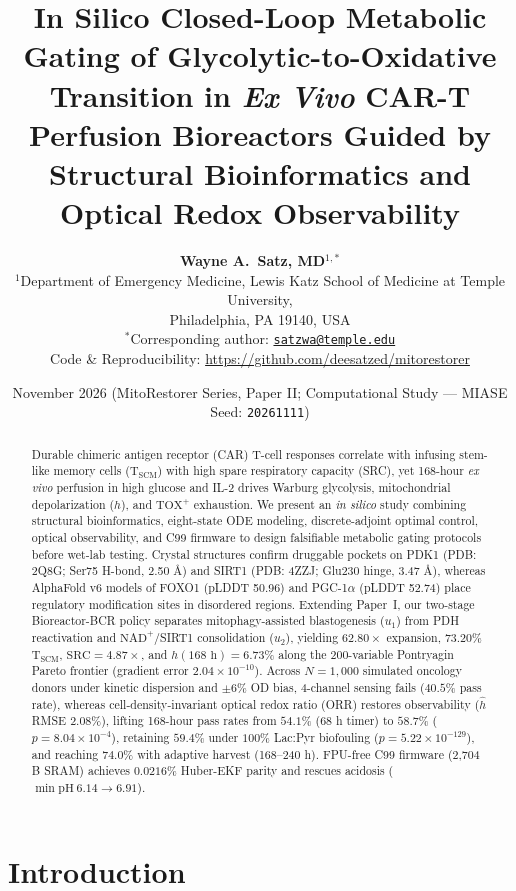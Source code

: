 \documentclass[11pt]{article}
\title{\LARGE\bfseries In Silico Closed-Loop Metabolic Gating of Glycolytic-to-Oxidative Transition in \textit{Ex Vivo} CAR-T Perfusion Bioreactors Guided by Structural Bioinformatics and Optical Redox Observability}
\author{
  \textbf{Wayne A.~Satz, MD}$^{1,*}$ \\[4pt]
  \normalsize $^{1}$Department of Emergency Medicine, Lewis Katz School of Medicine at Temple University, \\
  \normalsize Philadelphia, PA 19140, USA \\[3pt]
  \small $^{*}$Corresponding author: \href{mailto:satzwa@temple.edu}{\texttt{satzwa@temple.edu}} \\
  \small Code \& Reproducibility: \url{https://github.com/deesatzed/mitorestorer}
}
\date{\small November 2026 \quad (MitoRestorer Series, Paper II; Computational Study --- MIASE Seed: \texttt{20261111})}
\theoremstyle{plain}
\theoremstyle{remark}
\begin{document}
\maketitle

\begin{abstract}
\noindent Durable chimeric antigen receptor (CAR) T-cell responses correlate with infusing stem-like memory cells ($\mathrm{T}_{\mathrm{SCM}}$) with high spare respiratory capacity (SRC), yet 168-hour \textit{ex vivo} perfusion in high glucose and IL-2 drives Warburg glycolysis, mitochondrial depolarization ($h$), and $\mathrm{TOX}^+$ exhaustion. We present an \textit{in silico} study combining structural bioinformatics, eight-state ODE modeling, discrete-adjoint optimal control, optical observability, and C99 firmware to design falsifiable metabolic gating protocols before wet-lab testing. Crystal structures confirm druggable pockets on PDK1 (PDB: 2Q8G; Ser75 H-bond, 2.50 \AA) and SIRT1 (PDB: 4ZZJ; Glu230 hinge, 3.47 \AA), whereas AlphaFold v6 models of FOXO1 (pLDDT 50.96) and PGC-1$\alpha$ (pLDDT 52.74) place regulatory modification sites in disordered regions. Extending Paper~I, our two-stage Bioreactor-BCR policy separates mitophagy-assisted blastogenesis ($u_1$) from PDH reactivation and $\mathrm{NAD}^+$/SIRT1 consolidation ($u_2$), yielding $62.80\times$ expansion, $73.20\%$ $\mathrm{T}_{\mathrm{SCM}}$, $\mathrm{SRC} = 4.87\times$, and $h(168\text{ h}) = 6.73\%$ along the 200-variable Pontryagin Pareto frontier (gradient error $2.04 \times 10^{-10}$). Across $N = 1{,}000$ simulated oncology donors under kinetic dispersion and $\pm 6\%$ OD bias, 4-channel sensing fails ($40.5\%$ pass rate), whereas cell-density-invariant optical redox ratio (ORR) restores observability ($\hat{h}$ RMSE $2.08\%$), lifting 168-hour pass rates from $54.1\%$ (68 h timer) to $58.7\%$ ($p = 8.04 \times 10^{-4}$), retaining $59.4\%$ under $100\%$ Lac:Pyr biofouling ($p = 5.22 \times 10^{-129}$), and reaching $74.0\%$ with adaptive harvest (168--240 h). FPU-free C99 firmware (2,704 B SRAM) achieves $0.0216\%$ Huber-EKF parity and rescues acidosis ($\min\mathrm{pH}\ 6.14 \to 6.91$).
\end{abstract}

\section{Introduction}
\end{document}

